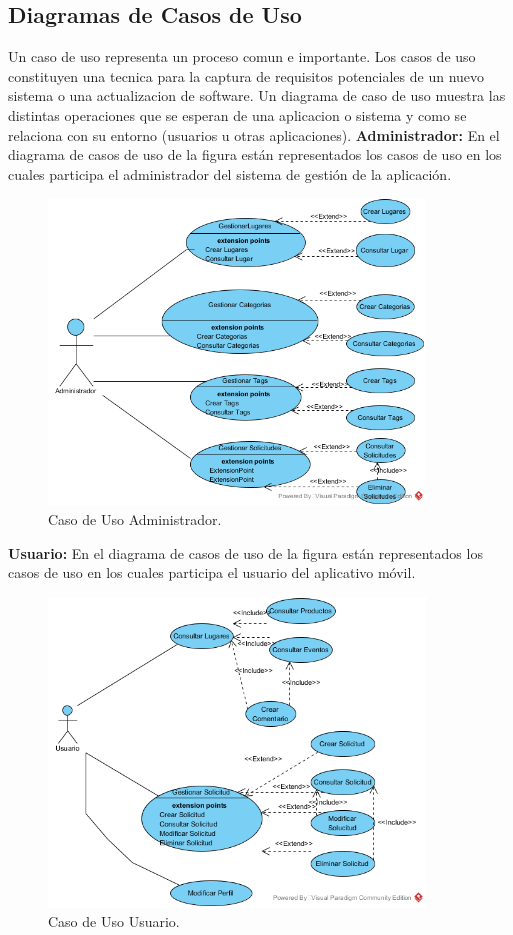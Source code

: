 \documentclass[12pt,letterpaper,openany]{book}
\begin{document}
\subsection{Diagramas de Casos de Uso}
Un caso de uso representa un proceso comun e importante. Los casos de uso constituyen una tecnica para la captura de requisitos potenciales de un nuevo sistema o una actualizacion de software. Un diagrama de caso de uso muestra las distintas operaciones que se esperan de una aplicacion o sistema y como se relaciona con su entorno (usuarios u otras aplicaciones).
\vspace{5mm}\newline
\textbf{Administrador:} En el diagrama de casos de uso de la figura están representados los casos de uso en los cuales participa el administrador del sistema de gestión de la aplicación.
\begin{figure}[H]
\begin{center}
\includegraphics[width=10cm]{./imagenes/CU/cu_administrador}
\caption{Caso de Uso Administrador.}
\end{center}
\end{figure}

\textbf{Usuario:} En el diagrama de casos de uso de la figura están representados los casos de uso en los cuales participa el usuario del aplicativo móvil.
\begin{figure}[H]
\begin{center}
\includegraphics[width=10cm]{./imagenes/CU/cu_usuario}
\caption{Caso de Uso Usuario.}
\end{center}
\end{figure}
\end{document}
